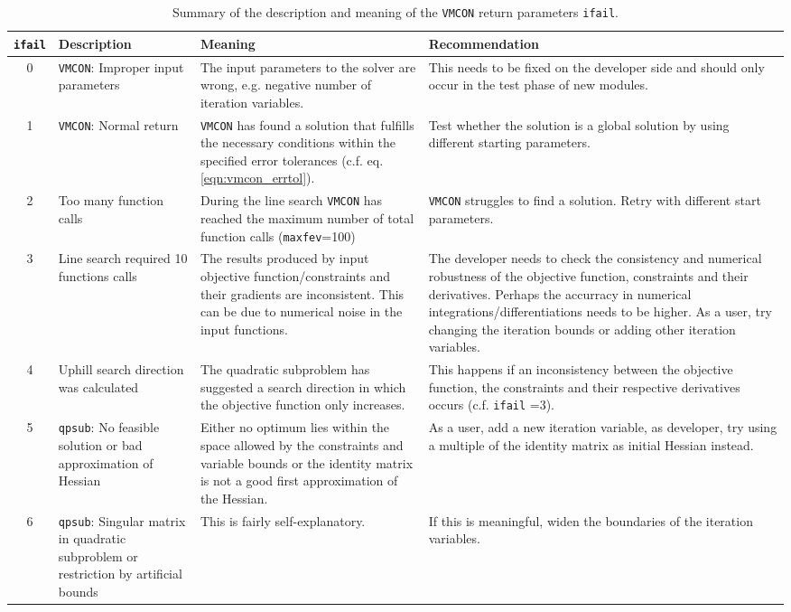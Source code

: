 \documentclass[11pt,a4paper]{report}
\newcommand{\ifail}{\mbox{\texttt{ifail}}}
\newcommand{\vmcon}{\mbox{\texttt{VMCON}}}
\begin{document}
\begin{table}
\footnotesize
\begin{center}
\begin{tabular}{|c|p{2.7cm}|p{3.4cm}|p{3.4cm}|}
  \hline
  \ifail\/ & Description & Meaning & Recommendation \\
  \hline
  \colorbox{red!20}{ 0 }&\vmcon: Improper input parameters & The input
  parameters to the solver are wrong, e.g. negative number of iteration
  variables. & This needs to be fixed on the developer side and should only
  occur in the test phase of new modules. \\
  \hline
  \colorbox{green!20}{ 1 } &\vmcon: Normal return & \vmcon\/ has found a
  solution that fulfills the necessary conditions within the specified error
  tolerances (c.f. eq. \ref{eqn:vmcon_errtol}). & Test whether the solution is
  a global solution by using different starting parameters.\\
  \hline
  \colorbox{red!20}{ 2 } & Too many function calls & During the line search
  \vmcon\/ has reached the maximum number of total function calls
  (\texttt{maxfev}=100)  & \vmcon\/ struggles to find a solution. Retry with
  different start parameters. \\
  \hline
  \colorbox{red!20}{ 3 } & Line search required 10 functions calls & The
  results produced by input objective function/constraints and  their
  gradients are inconsistent. This can be due to numerical noise in the input
  functions. & The developer needs to check the consistency and numerical
  robustness of the objective function, constraints and their
  derivatives. Perhaps the accurracy in numerical
  integrations/differentiations needs to be higher. As a user, try changing
  the iteration bounds or adding other iteration variables. \\
  \hline
  \colorbox{red!20}{ 4 } & Uphill search direction was calculated & The
  quadratic subproblem has suggested a search direction in which the objective
  function only increases.  & This happens if an inconsistency between the
  objective function, the constraints and their respective derivatives occurs
  (c.f. \ifail\/ =3).\\
  \hline
  \colorbox{red!20}{ 5 }&\texttt{qpsub}: No feasible solution or bad
  approximation of Hessian & Either no optimum lies within the space allowed
  by the constraints and variable bounds or the identity matrix is not a good
  first approximation of the Hessian. & As a user, add a new iteration
  variable, as developer, try using a multiple of the identity matrix as
  initial Hessian instead.\\
  \hline
  \colorbox{red!20}{ 6 } &\texttt{qpsub}: Singular matrix in quadratic
  subproblem or restriction by artificial bounds & This is fairly
  self-explanatory. & If this is meaningful, widen the boundaries of the
  iteration variables.  \\
  \hline
\end{tabular}
\end{center}
\caption{Summary of the description and  meaning of the \vmcon\/ return
  parameters \ifail\/. }
\label{tab:ifail}
\normalsize
\end{table}
\end{document}
